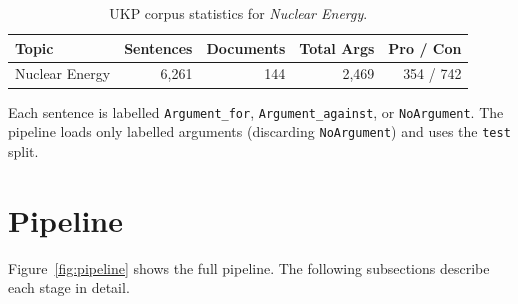 \documentclass[runningheads]{llncs}
\begin{document}
\begin{table}[t]
\caption{UKP corpus statistics for \emph{Nuclear Energy}.}
\label{tab:ukp}
\centering
\begin{tabular}{lrrrr}
\toprule
Topic & Sentences & Documents & Total Args & Pro / Con \\
\midrule
Nuclear Energy & 6{,}261 & 144 & 2{,}469 & 354 / 742 \\
\bottomrule
\end{tabular}
\end{table}

Each sentence is labelled \texttt{Argument\_for}, \texttt{Argument\_against},
or \texttt{NoArgument}. The pipeline loads only labelled arguments
(discarding \texttt{NoArgument}) and uses the \texttt{test} split.

\section{Pipeline}
\label{sec:pipeline}
Figure~\ref{fig:pipeline} shows the full pipeline. The following
subsections describe each stage in detail.
\end{document}
